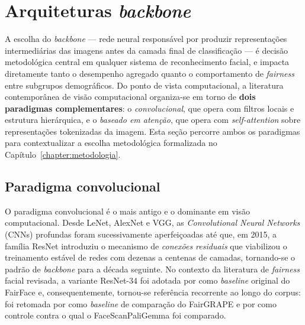 \section{Arquiteturas \emph{backbone}}
\label{sec:rl_backbones}

A escolha do \emph{backbone} --- rede neural responsável por produzir representações intermediárias das imagens antes da camada final de classificação --- é decisão metodológica central em qualquer sistema de reconhecimento facial, e impacta diretamente tanto o desempenho agregado quanto o comportamento de \emph{fairness} entre subgrupos demográficos. Do ponto de vista computacional, a literatura contemporânea de visão computacional organiza-se em torno de \textbf{dois paradigmas complementares}: o \emph{convolucional}, que opera com filtros locais e estrutura hierárquica, e o \emph{baseado em atenção}, que opera com \emph{self-attention} sobre representações tokenizadas da imagem. Esta seção percorre ambos os paradigmas para contextualizar a escolha metodológica formalizada no Capítulo~\ref{chapter:metodologia}.

\subsection{Paradigma convolucional}
\label{sec:rl_backbones_conv}

O paradigma convolucional é o mais antigo e o dominante em visão computacional. Desde LeNet, AlexNet e VGG, as \emph{Convolutional Neural Networks} (CNNs) profundas foram sucessivamente aperfeiçoadas até que, em 2015, a família ResNet introduziu o mecanismo de \emph{conexões residuais} que viabilizou o treinamento estável de redes com dezenas a centenas de camadas, tornando-se o padrão de \emph{backbone} para a década seguinte. No contexto da literatura de \emph{fairness} facial revisada, a variante ResNet-34 foi adotada por  como \emph{baseline} original do FairFace e, consequentemente, tornou-se referência recorrente ao longo do corpus: foi retomada por  como \emph{baseline} de comparação do FairGRAPE e por  como controle contra o qual o FaceScanPaliGemma foi comparado.

